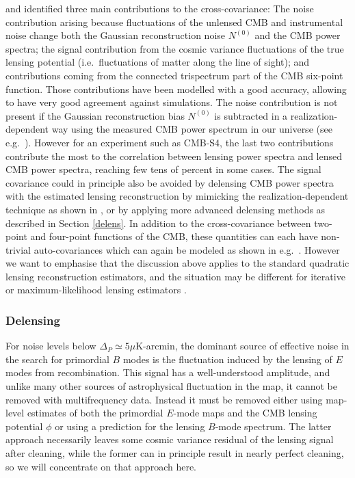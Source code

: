 \cite{Schmittfull:2013uea} and \cite{Peloton:prep} identified three main contributions to the cross-covariance: The noise contribution arising because fluctuations of the unlensed CMB and instrumental noise change both the Gaussian reconstruction noise $N^{(0)}$ and the CMB power spectra;
the signal contribution from the cosmic variance fluctuations of the true lensing potential (i.e.~fluctuations of matter along the line of sight); and contributions coming from the connected trispectrum part of the CMB six-point function.
Those contributions have been modelled with a good accuracy, allowing to have very good agreement against simulations.
The noise contribution is not present if the Gaussian reconstruction bias $N^{(0)}$ is subtracted in a realization-dependent way using the measured CMB power spectrum in our universe (see e.g.~\cite{Hanson:2010rp,Schmittfull:2013uea}).
However for an experiment such as CMB-S4, the last two contributions contribute the most to the correlation between lensing power spectra and lensed CMB power spectra, reaching few tens of percent in some cases.
The signal covariance could in principle also be avoided by delensing CMB power spectra with the estimated lensing reconstruction by mimicking the realization-dependent technique as shown in \cite{Schmittfull:2013uea}, or by applying more advanced delensing methods as described in Section \ref{delens}.
In addition to the cross-covariance between two-point and four-point functions of the CMB, these quantities can each have non-trivial auto-covariances which can again be modeled as shown in e.g.~\cite{Smith:2005ue,Smith:2006nk,Li:2006pu,BenoitLevy:2012va,Schmittfull:2013uea,Peloton:prep}. 
However we want to emphasise that the discussion above applies to the standard quadratic lensing reconstruction estimators, and the situation may be different for iterative or maximum-likelihood lensing estimators \cite{Hirata:2002jy}.

\subsubsection{Delensing}
For noise levels below $\Delta_P \simeq 5 \mu$K-arcmin,  the dominant source of effective noise in the search for primordial $B$ modes is the fluctuation induced by the lensing of $E$ modes from recombination.  This signal has a well-understood amplitude, and unlike many other sources of astrophysical fluctuation in the map, it cannot be removed with multifrequency data.  Instead it must be removed either using map-level estimates of both the primordial $E$-mode maps and the CMB lensing potential $\phi$ or using a prediction for the lensing $B$-mode spectrum. The latter approach necessarily leaves some cosmic variance residual of the lensing signal after cleaning, while the former can in principle result in nearly perfect cleaning, so we will concentrate on that approach here.

